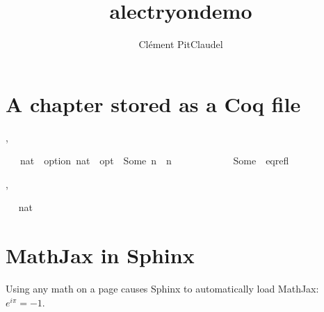 \documentclass[letterpaper,10pt,english]{sphinxmanual}
\title{alectryon\sphinxhyphen{}demo}
\date{ }
\author{Clément Pit\sphinxhyphen{}Claudel}
\begin{document}
\pagestyle{empty}
\sphinxmaketitle
\pagestyle{plain}
\sphinxtableofcontents
\pagestyle{normal}
\label{\detokenize{index::doc}}


\sphinxstepscope


\chapter{A chapter stored as a Coq file}
\label{\detokenize{coqchapter:a-chapter-stored-as-a-coq-file}}\label{\detokenize{coqchapter::doc}}
\begin{alectryon}
  \sep
  \begin{sentence}
    \begin{input}
      ~~~nat~~option~nat~~opt~~Some~n~~n\nl
      ~~~~~~~~~~~\PYGZus{}~Some~~eq\PYGZus{}refl
    \end{input}
    \sep
    \begin{output}
      \begin{messages}
        \begin{message}
          ~\nl
          ~nat
        \end{message}
      \end{messages}
    \end{output}
  \end{sentence}
\end{alectryon}

\sphinxstepscope


\chapter{MathJax in Sphinx}
\label{\detokenize{math:mathjax-in-sphinx}}\label{\detokenize{math::doc}}
\sphinxAtStartPar
Using any math on a page causes Sphinx to automatically load MathJax: \(e^{i\pi} = -1\).
\end{document}
